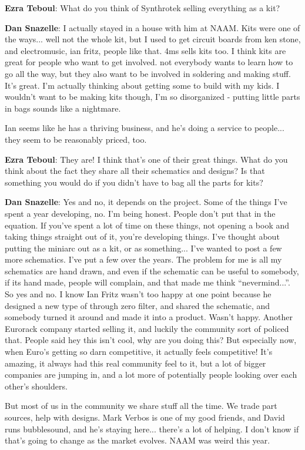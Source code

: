 \textbf{Ezra Teboul}: What do you think of Synthrotek selling everything as a kit? 

\textbf{Dan Snazelle}: I actually stayed in a house with him at NAAM. Kits were one of the ways... well not the whole kit, but I used to get circuit boards from ken stone, and electromusic, ian fritz, people like that. 4ms sells kits too. I think kits are great for people who want to get involved. not everybody wants to learn how to go all the way, but they also want to be involved in soldering and making stuff. It's great. I'm actually thinking about getting some to build with my kids. I wouldn't want to be making kits though, I'm so disorganized - putting little parts in bags sounds like a nightmare. 

Ian seems like he has a thriving business, and he's doing a service to people... they seem to be reasonably priced, too. 

\textbf{Ezra Teboul}: They are! I think that's one of their great things. What do you think about the fact they share all their schematics and designs? Is that something you would do if you didn't have to bag all the parts for kits? 

\textbf{Dan Snazelle}: Yes and no, it depends on the project. Some of the things I've spent a year developing, no. I'm being honest. People don't put that in the equation. If you've spent a lot of time on these things, not opening a book and taking things straight out of it, you're developing things. I've thought about putting the miniarc out as a kit, or as something... I've wanted to post a few more schematics. I've put a few over the years. The problem for me is all my schematics are hand drawn, and even if the schematic can be useful to somebody, if its hand made, people will complain, and that made me think ``nevermind...''. So yes and no. I know Ian Fritz wasn't too happy at one point because he designed a new type of through zero filter, and shared the schematic, and somebody turned it around and made it into a product. Wasn't happy. Another Eurorack company started selling it, and luckily the community sort of policed that. People said hey this isn't cool, why are you doing this? But especially now, when Euro's getting so darn competitive, it actually feels competitive! It's amazing, it always had this real community feel to it, but a lot of bigger companies are jumping in, and a lot more of potentially people looking over each other's shoulders. 

But most of us in the community we share stuff all the time. We trade part sources, help with designs. Mark Verbos is one of my good friends, and David runs bubblesound, and he's staying here... there's a lot of helping. I don't know if that's going to change as the market evolves. NAAM was weird this year. 

